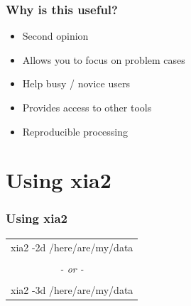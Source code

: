 \documentclass[slides,compress]{beamer}
\begin{document}
\begin{frame}
\frametitle{Why is this useful?}
\begin{itemize}
\item{Second opinion}
\item{Allows you to focus on problem cases}
\item{Help  busy / novice users}
\item{Provides access to other tools}
\item{Reproducible processing}
\end{itemize}
\end{frame}

\section{Using xia2}

\begin{frame}
\frametitle{Using xia2}
\begin{tabular}{c}
{\huge
xia2 -2d /here/are/my/data
}\\
\\
{\huge \emph{- or -}} \\
\\
{\huge
xia2 -3d /here/are/my/data
}\\
\end{tabular}
\end{frame}
\end{document}
